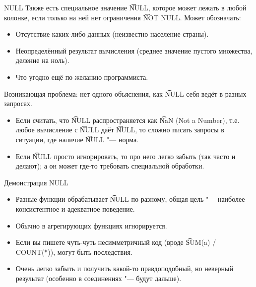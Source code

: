 \begin{frame}{NULL}
	Также есть специальное значение \t{NULL}, которое может лежать в любой колонке, если только на ней нет ограничения \t{NOT NULL}.
	Может обозначать:
	\begin{itemize}
		\item Отсутствие каких-либо данных (неизвестно население страны).
		\item Неопределённый результат вычисления (среднее значение пустого множества, деление на ноль).
		\item Что угодно ещё по желанию программиста.
	\end{itemize}
	Возникающая проблема: нет одного объяснения, как \t{NULL} себя ведёт в разных запросах.
	\begin{itemize}
		\item
			Если считать, что \t{NULL} распространяется как \t{NaN} (Not a Number), т.е. любое вычисление с \t{NULL} даёт \t{NULL},
			то сложно писать запросы в ситуации, где наличие \t{NULL} "--- норма.
		\item
			Если \t{NULL} просто игнорировать, то про него легко забыть (так часто и делают); а он может где-то требовать специальной обработки.
	\end{itemize}
\end{frame}

\begin{frame}{Демонстрация NULL}
    \begin{itemize}
    	\item Разные функции обрабатывает \t{NULL} по-разному, общая цель "--- наиболее консистентное и адекватное поведение.
    	\item Обычно в агрегирующих функциях игнорируется.
    	\item Если вы пишете чуть-чуть несимметричный код (вроде \t{SUM(a) / COUNT(*)}), могут быть последствия.
    	\item Очень легко забыть и получить какой-то правдоподобный, но неверный результат (особенно в соединениях "--- будут дальше).
    \end{itemize}
\end{frame}
